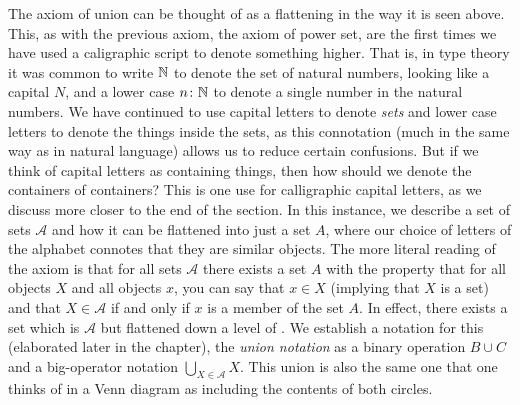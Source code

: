 \documentclass[11pt]{article}
\begin{document}
The axiom of union can be thought of as a flattening in the way it is seen above. This, as with the previous axiom, the axiom of power set, are the first times we have used a caligraphic script to denote something higher. That is, in type theory it was common to write $\mathbb{N}$ to denote the set of natural numbers, looking like a capital $N$, and a lower case $n \colon \mathbb{N}$ to denote a single number in the natural numbers. We have continued to use capital letters to denote \emph{sets} and lower case letters to denote the things inside the sets, as this connotation (much in the same way as in natural language) allows us to reduce certain confusions. But if we think of capital letters as containing things, then how should we denote the containers of containers? This is one use for calligraphic capital letters, as we discuss more closer to the end of the section. In this instance, we describe a set of sets $\mathcal{A}$ and how it can be flattened into just a set $A$, where our choice of letters of the alphabet connotes that they are similar objects. The more literal reading of the axiom is that for all sets $\mathcal{A}$ there exists a set $A$ with the property that for all objects $X$ and all objects $x$, you can say that $x\in X$ (implying that $X$ is a set) and that $X \in \mathcal{A}$ if and only if $x$ is a member of the set $A$. In effect, there exists a set which is $\mathcal{A}$ but flattened down a level of . We establish a notation for this (elaborated later in the chapter), the \emph{union notation} as a binary operation $B \cup C$ and a big-operator notation $\bigcup_{X \in \mathcal{A}} X$. This union is also the same one that one thinks of in a Venn diagram as including the contents of both circles.
\end{document}
